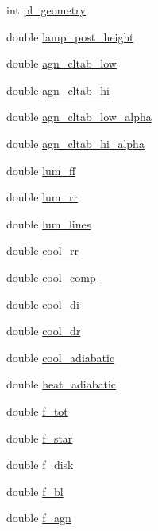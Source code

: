 \begin{DoxyCompactItemize}
int \hyperlink{structgeometry_a042bb87d1eecaa02b96251a50ce27c5a}{pl\+\_\+geometry}
\item 
double \hyperlink{structgeometry_a84953aedf654c1f29c00429e166a6629}{lamp\+\_\+post\+\_\+height}
\item 
double \hyperlink{structgeometry_a91f0c12397ed5ef235952fb13c4dad08}{agn\+\_\+cltab\+\_\+low}
\item 
double \hyperlink{structgeometry_a7a9663a6283f351e1dd37652b15e49c4}{agn\+\_\+cltab\+\_\+hi}
\item 
double \hyperlink{structgeometry_a3621385f864e371369e43e96b0ea88f4}{agn\+\_\+cltab\+\_\+low\+\_\+alpha}
\item 
double \hyperlink{structgeometry_a8073880af6d7448484b9d255980b96c1}{agn\+\_\+cltab\+\_\+hi\+\_\+alpha}
\item 
double \hyperlink{structgeometry_ac1f5d7e27d5cddc6c531e1b1e8e235ef}{lum\+\_\+ff}
\item 
double \hyperlink{structgeometry_a0ac777645064d9406dba3e396f533e49}{lum\+\_\+rr}
\item 
double \hyperlink{structgeometry_a18e62e654ed4ff9814d48494cba520de}{lum\+\_\+lines}
\item 
double \hyperlink{structgeometry_ace50a76a1673ac116e8a4f8021da250d}{cool\+\_\+rr}
\item 
double \hyperlink{structgeometry_ac01c81c77767f085d2b7b6c15196d512}{cool\+\_\+comp}
\item 
double \hyperlink{structgeometry_a490f2f429fa56a02a488924e669df079}{cool\+\_\+di}
\item 
double \hyperlink{structgeometry_a034193beb526716a679e7d7b54cf975b}{cool\+\_\+dr}
\item 
double \hyperlink{structgeometry_af35206adaff2df187ea036302db44248}{cool\+\_\+adiabatic}
\item 
double \hyperlink{structgeometry_a5da14a1eb85f3dca6863b6acb86bef12}{heat\+\_\+adiabatic}
\item 
double \hyperlink{structgeometry_ad5447868ade5623c1e82f43d3e023927}{f\+\_\+tot}
\item 
double \hyperlink{structgeometry_a33bc4357b9b25da6846e2580389ccae9}{f\+\_\+star}
\item 
double \hyperlink{structgeometry_a680f63b1b2306f462005771b7328c31d}{f\+\_\+disk}
\item 
double \hyperlink{structgeometry_ae7f71e5cf3066453c7a1aab90d32872c}{f\+\_\+bl}
\item 
double \hyperlink{structgeometry_aef1dd41638758c1e64895dbb2dfabb8e}{f\+\_\+agn}

\end{DoxyCompactItemize}
